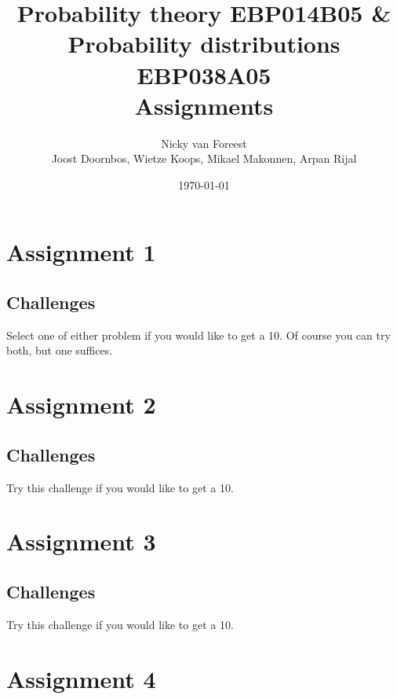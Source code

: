\documentclass[a4paper,12pt]{article}
\author{Nicky van Foreest \\
  Joost Doornbos, Wietze Koops, Mikael Makonnen, Arpan Rijal
}
\date{\today}
\title{Probability theory EBP014B05 \& Probability distributions EBP038A05\\
Assignments}
\begin{document}
\maketitle
\tableofcontents






\section{Assignment 1}





\clearpage
\subsection{Challenges}
Select one of either problem if you would like to get a 10. Of course you can try both, but one suffices.




\section{Assignment 2}




\clearpage
\subsection{Challenges}
Try this challenge  if you would like to get a 10.


\section{Assignment 3}






\clearpage
\subsection{Challenges}
Try this challenge  if you would like to get a 10.


\section{Assignment 4}




\end{document}
